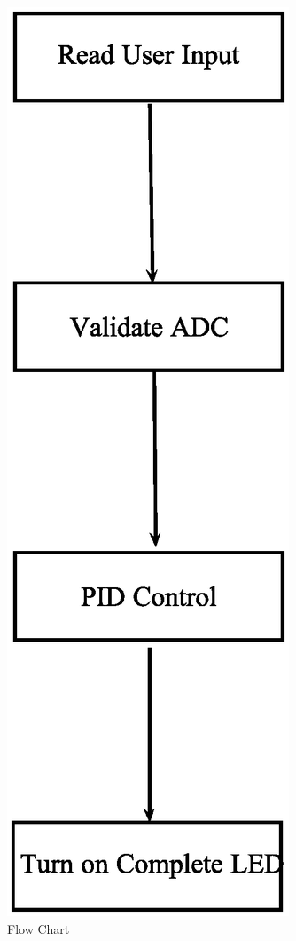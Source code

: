 \documentclass[10pt,conference]{IEEEtran}
\begin{document}
\begin{figure}[ht]
	\includegraphics[scale=.45]{FlowChart}
	\caption{Flow Chart}\label{F:FlowChart}
\end{figure}
\end{document}
